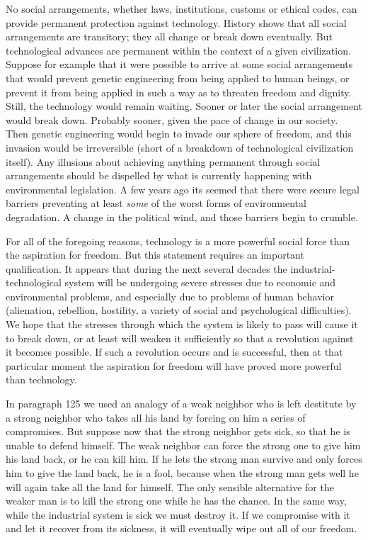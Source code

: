  No social arrangements, whether laws, institutions, customs or ethical codes, can provide permanent protection against technology. History shows that all social arrangements are transitory; they all change or break down eventually. But technological advances are permanent within the context of a given civilization. Suppose for example that it were possible to arrive at some social arrangements that would prevent genetic engineering from being applied to human beings, or prevent it from being applied in such a way as to threaten freedom and dignity. Still, the technology would remain waiting. Sooner or later the social arrangement would break down. Probably sooner, given the pace of change in our society. Then genetic engineering would begin to invade our sphere of freedom, and this invasion would be irreversible (short of a breakdown of technological civilization itself). Any illusions about achieving anything permanent through social arrangements should be dispelled by what is currently happening with environmental legislation. A few years ago its seemed that there were secure legal barriers preventing at least {\em some} of the worst forms of environmental degradation. A change in the political wind, and those barriers begin to crumble.

 For all of the foregoing reasons, technology is a more powerful social force than the aspiration for freedom. But this statement requires an important qualification. It appears that during the next several decades the industrial-technological system will be undergoing severe stresses due to economic and environmental problems, and especially due to problems of human behavior (alienation, rebellion, hostility, a variety of social and psychological difficulties). We hope that the stresses through which the system is likely to pass will cause it to break down, or at least will weaken it sufficiently so that a revolution against it becomes possible. If such a revolution occurs and is successful, then at that particular moment the aspiration for freedom will have proved more powerful than technology.

 In paragraph 125 we used an analogy of a weak neighbor who is left destitute by a strong neighbor who takes all his land by forcing on him a series of compromises. But suppose now that the strong neighbor gets sick, so that he is unable to defend himself. The weak neighbor can force the strong one to give him his land back, or he can kill him. If he lets the strong man survive and only forces him to give the land back, he is a fool, because when the strong man gets well he will again take all the land for himself. The only sensible alternative for the weaker man is to kill the strong one while he has the chance. In the same way, while the industrial system is sick we must destroy it. If we compromise with it and let it recover from its sickness, it will eventually wipe out all of our freedom.


